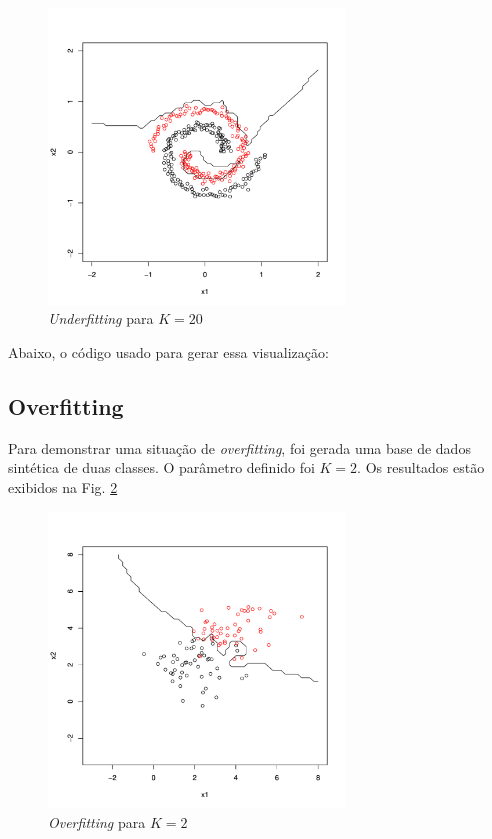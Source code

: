 \documentclass[a4paper]{article}
\begin{document}
\begin{figure}[H]
	\centering
	\includegraphics[page=1,width=0.7\textwidth]{../underfitting.pdf}
	\caption{\textit{Underfitting} para $K = 20$}
	\label{fig:underfitting}
\end{figure}

Abaixo, o código usado para gerar essa visualização:



\subsection{Overfitting}

Para demonstrar uma situação de \textit{overfitting}, foi gerada uma base de dados sintética de duas classes. O parâmetro definido foi $K = 2$. Os resultados estão exibidos na Fig. \ref{fig:overfitting}

\begin{figure}[H]
	\centering
	\includegraphics[page=1,width=0.7\textwidth]{../overfitting.pdf}
	\caption{\textit{Overfitting} para $K = 2$}
	\label{fig:overfitting}
\end{figure}
\end{document}
